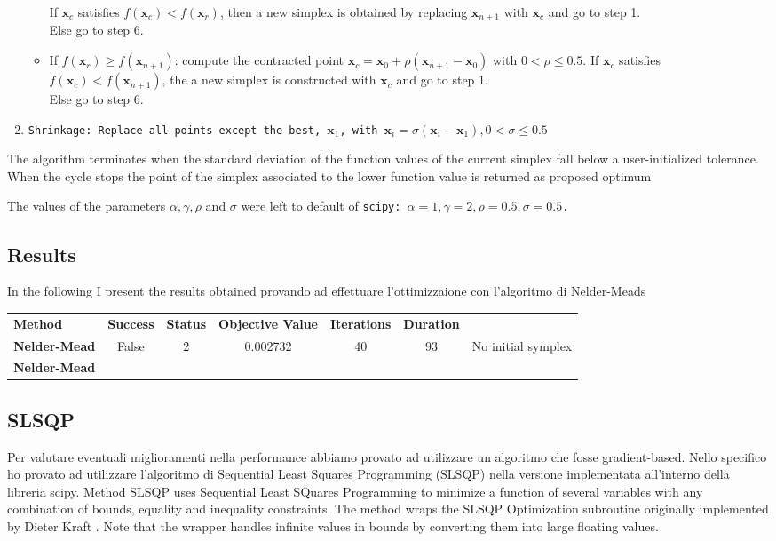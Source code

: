 \begin{enumerate}
\begin{itemize}
                If $\mathbf{x}_c$ satisfies $f(\mathbf{x}_c) < f(\mathbf{x}_{r})$, then a new simplex is obtained by replacing $\mathbf{x}_{n+1}$ with  $\mathbf{x}_c$ and go to step 1.\\
                Else go to step 6.
        \item  If $f(\mathbf{x}_r) \geq f(\mathbf{x}_{n+1})$: compute the contracted point $\mathbf{x}_c=\mathbf{x}_0 +\rho(\mathbf{x}_{n+1}-\mathbf{x}_0)$ with $0<\rho \leq 0.5$.
                If $\mathbf{x}_c$ satisfies $f(\mathbf{x}_c) < f(\mathbf{x}_{n+1})$, the a new simplex is constructed with $\mathbf{x}_c$ and go to step 1.\\
                Else go to step 6.
    \end{itemize}
    \item \tt{Shrinkage}: Replace all points except the best, $\mathbf{x}_1$, with $\mathbf{x}_i = \sigma(\mathbf{x}_i - \mathbf{x}_1), 0<\sigma \leq 0.5$  
\end{enumerate}
The algorithm terminates when the standard deviation of the function values of the current simplex fall below a user-initialized tolerance. 
When the cycle stops the point of the simplex associated to the lower function value is returned as proposed optimum

The values of the parameters $\alpha, \gamma, \rho$ and $\sigma$ were left to default of \tt{scipy}: $\alpha=1, \gamma=2, \rho=0.5, \sigma=0.5$. 

\subsection{Results}
In the following I present the results obtained provando ad effettuare l'ottimizzaione con l'algoritmo di Nelder-Meads

\begin{tabular}{lcccccc}
    \textbf{Method} & \textbf{Success} & \textbf{Status} & \textbf{Objective Value} & \textbf{Iterations} & \textbf{Duration}\\
    \textbf{Nelder-Mead} & False & 2 & 0.002732 & 40 & 93 & No initial symplex\\
    \textbf{Nelder-Mead}
\end{tabular}

\subsection{SLSQP}
Per valutare eventuali miglioramenti nella performance abbiamo provato ad utilizzare un algoritmo che fosse gradient-based. 
Nello specifico ho provato ad utilizzare l'algoritmo di Sequential Least Squares Programming (SLSQP) nella versione implementata all'interno della libreria scipy.
Method SLSQP uses Sequential Least SQuares Programming to minimize a function of several variables with any combination of bounds, equality and inequality constraints. 
The method wraps the SLSQP Optimization subroutine originally implemented by Dieter Kraft \cite{kraft1988slsqp}.  
Note that the wrapper handles infinite values in bounds by converting them into large floating values.

